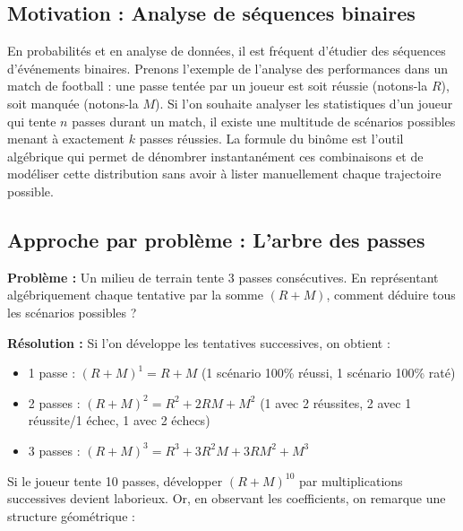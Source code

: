 \subsection{Motivation : Analyse de séquences binaires}
En probabilités et en analyse de données, il est fréquent d'étudier des séquences d'événements binaires. Prenons l'exemple de l'analyse des performances dans un match de football : une passe tentée par un joueur est soit réussie (notons-la $R$), soit manquée (notons-la $M$). Si l'on souhaite analyser les statistiques d'un joueur qui tente $n$ passes durant un match, il existe une multitude de scénarios possibles menant à exactement $k$ passes réussies. La formule du binôme est l'outil algébrique qui permet de dénombrer instantanément ces combinaisons et de modéliser cette distribution sans avoir à lister manuellement chaque trajectoire possible.

\subsection{Approche par problème : L'arbre des passes}
\textbf{Problème :} Un milieu de terrain tente 3 passes consécutives. En représentant algébriquement chaque tentative par la somme $(R + M)$, comment déduire tous les scénarios possibles ?

\textbf{Résolution :} Si l'on développe les tentatives successives, on obtient :
\begin{itemize}
    \item 1 passe : $(R+M)^1 = R + M$ (1 scénario 100\% réussi, 1 scénario 100\% raté)
    \item 2 passes : $(R+M)^2 = R^2 + 2RM + M^2$ (1 avec 2 réussites, 2 avec 1 réussite/1 échec, 1 avec 2 échecs)
    \item 3 passes : $(R+M)^3 = R^3 + 3R^2M + 3RM^2 + M^3$
\end{itemize}

Si le joueur tente 10 passes, développer $(R+M)^{10}$ par multiplications successives devient laborieux. Or, en observant les coefficients, on remarque une structure géométrique :

